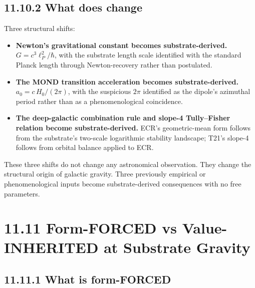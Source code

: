 \documentclass[11pt]{book}
\begin{document}
\subsection{11.10.2 What does change}

Three structural shifts:

\begin{itemize}
\item \textbf{Newton's gravitational constant becomes substrate-derived.} $G = c^3\ell_P^2/\hbar$, with the substrate length scale identified with the standard Planck length through Newton-recovery rather than postulated.
\item \textbf{The MOND transition acceleration becomes substrate-derived.} $a_0 = c\,H_0/(2\pi)$, with the suspicious $2\pi$ identified as the dipole's azimuthal period rather than as a phenomenological coincidence.
\item \textbf{The deep-galactic combination rule and slope-4 Tully–Fisher relation become substrate-derived.} ECR's geometric-mean form follows from the substrate's two-scale logarithmic stability landscape; T21's slope-4 follows from orbital balance applied to ECR.
\end{itemize}

These three shifts do not change any astronomical observation. They change the structural origin of galactic gravity. Three previously empirical or phenomenological inputs become substrate-derived consequences with no free parameters.

\section{11.11 Form-FORCED vs Value-INHERITED at Substrate Gravity}

\subsection{11.11.1 What is form-FORCED}
\end{document}
